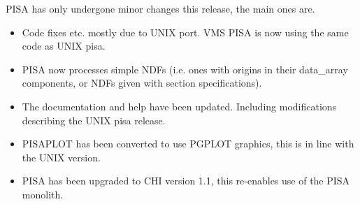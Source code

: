 PISA has only undergone minor changes this release, the main ones are.
\begin{itemize}
\item Code fixes etc. mostly due to UNIX port. VMS PISA is now using the
same code as UNIX pisa.

\item PISA now processes simple NDFs (i.e. ones with origins in their
data\_array components, or NDFs given with section specifications).

\item The documentation and help have been updated. Including
modifications describing the UNIX pisa release.

\item PISAPLOT has been converted to use PGPLOT graphics, this is in
line with the UNIX version.

\item PISA has been upgraded to CHI version 1.1, this re-enables use of
the PISA monolith.
\end{itemize}


